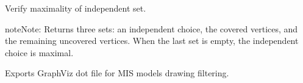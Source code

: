 \documentclass[letterpaper,10pt,english]{sphinxmanual}
\begin{document}
\begin{fulllineitems}
\begin{fulllineitems}
\label{techDoc:graphs.MISModel.checkMIS}
Verify maximality of independent set.

\begin{notice}{note}{Note:}
Returns three sets: an independent choice,
the covered vertices, and the remaining uncovered vertices.
When the last set is empty, the independent choice is maximal.
\end{notice}

\end{fulllineitems}


\begin{fulllineitems}
\label{techDoc:graphs.MISModel.exportGraphViz}
Exports GraphViz dot file  for MIS models drawing filtering.

\end{fulllineitems}


\begin{fulllineitems}
\label{techDoc:graphs.MISModel.generateMIS}
\end{fulllineitems}


\end{fulllineitems}

\end{document}
